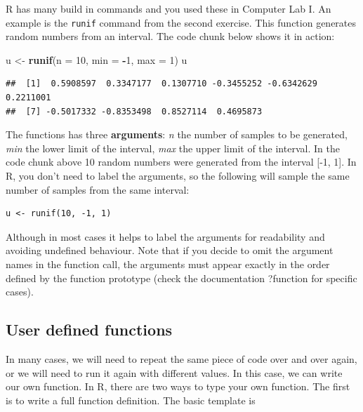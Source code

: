 \documentclass[
]{book}
\newenvironment{Shaded}{\begin{snugshade}}{\end{snugshade}}
\newcommand{\AttributeTok}[1]{\textcolor[rgb]{0.13,0.29,0.53}{#1}}
\newcommand{\DecValTok}[1]{\textcolor[rgb]{0.00,0.00,0.81}{#1}}
\newcommand{\FunctionTok}[1]{\textcolor[rgb]{0.13,0.29,0.53}{\textbf{#1}}}
\newcommand{\NormalTok}[1]{#1}
\newcommand{\OtherTok}[1]{\textcolor[rgb]{0.56,0.35,0.01}{#1}}
\newcommand{\SpecialCharTok}[1]{\textcolor[rgb]{0.81,0.36,0.00}{\textbf{#1}}}
\theoremstyle{definition}
\theoremstyle{definition}
\theoremstyle{definition}
\theoremstyle{definition}
\theoremstyle{remark}
\begin{document}
R has many build in commands and you used these in Computer Lab I. An example is the \texttt{runif} command from the second exercise. This function generates random numbers from an interval. The code chunk below shows it in action:

\begin{Shaded}
\begin{Highlighting}[]
\NormalTok{u }\OtherTok{\textless{}{-}} \FunctionTok{runif}\NormalTok{(}\AttributeTok{n =} \DecValTok{10}\NormalTok{, }\AttributeTok{min =} \SpecialCharTok{{-}}\DecValTok{1}\NormalTok{, }\AttributeTok{max =} \DecValTok{1}\NormalTok{)}
\NormalTok{u}
\end{Highlighting}
\end{Shaded}

\begin{verbatim}
##  [1]  0.5908597  0.3347177  0.1307710 -0.3455252 -0.6342629  0.2211001
##  [7] -0.5017332 -0.8353498  0.8527114  0.4695873
\end{verbatim}

The functions has three \textbf{arguments}: \emph{n} the number of samples to be generated, \emph{min} the lower limit of the interval, \emph{max} the upper limit of the interval. In the code chunk above 10 random numbers were generated from the interval {[}-1, 1{]}. In R, you don't need to label the arguments, so the following will sample the same number of samples from the same interval:

\begin{verbatim}
u <- runif(10, -1, 1)
\end{verbatim}

Although in most cases it helps to label the arguments for readability and avoiding undefined behaviour. Note that if you decide to omit the argument names in the function call, the arguments must appear exactly in the order defined by the function prototype (check the documentation ?function for specific cases).

\hypertarget{user-defined-functions}{%
\subsection{User defined functions}\label{user-defined-functions}}

In many cases, we will need to repeat the same piece of code over and over again, or we will need to run it again with different values. In this case, we can write our own function. In R, there are two ways to type your own function. The first is to write a full function definition. The basic template is
\end{document}
